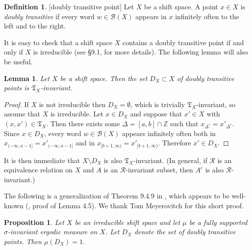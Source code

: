\documentclass{amsproc}
\numberwithin{theorem}{section}
\newtheorem{lemma}[theorem]{Lemma}
\newtheorem{proposition}[theorem]{Proposition}
\theoremstyle{remark}
\theoremstyle{definition}
\newtheorem{defn}[theorem]{Definition}
\newcommand{\cB}{\mathcal{B}}
\newcommand{\fT}{\mathfrak{T}}
\newcommand{\Z}{\mathbb{Z}}
\theoremstyle{plain}
\begin{document}
\begin{defn}\label{defn-doub-trans} [doubly transitive point]
Let $X$ be a shift space. A point $x \in X$ is \textit{doubly transitive} if every word $w \in \cB(X)$ appears in $x$ infinitely often to the left and to the right.
\end{defn}


It is easy to check that a shift space $X$ contains a doubly transitive point if and only if $X$ is irreducible (see \S 9.1, \cite{lind1995introduction} for more details). The following lemma will also be useful.

\begin{lemma}\label{lemma-doub-trans-invar}
Let $X$ be a shift space. Then the set $D_X \subset X$ of doubly transitive points is $\fT_X$-invariant.
\end{lemma}

\begin{proof}
If $X$ is not irreducible then $D_X = \emptyset$, which is trivially $\fT_X$-invariant, so assume that $X$ is irreducible. Let $x \in D_X$ and suppose that $x' \in X$ with $(x,x') \in \fT_X$. Then there exists some $\Delta = [a,b] \cap \Z$ such that $x_{\Delta^c} = x'_{\Delta^c}$. Since $x \in D_X$, every word $w \in \cB(X)$ appears infinitely often both in $x_{(-\infty, a-1]} = x'_{(-\infty, a-1]}$ and in $x_{[b+1, \infty)} = x'_{[b+1, \infty)}$. Therefore $x' \in D_X$.
\end{proof}

It is then immediate that $X \setminus D_X$ is also $\fT_X$-invariant. (In general, if $\mathcal{R}$ is an equivalence relation on $X$ and $A$ is an $\mathcal{R}$-invariant subset, then $A^c$ is also $\mathcal{R}$-invariant.)

The following is a generalization of Theorem 9.4.9 in \cite{lind1995introduction}, which appears to be well-known (\cite{yoo2018decomposition}, proof of Lemma 4.5). We thank Tom Meyerovitch for this short proof. 


\begin{proposition}\label{prop-doub-trans-full-meas}
Let $X$ be an irreducible shift space and let $\mu$ be a fully supported $\sigma$-invariant ergodic  measure on $X$. Let $D_X$ denote the set of doubly transitive points. Then $\mu(D_X) = 1$.
\end{proposition}
\end{document}
